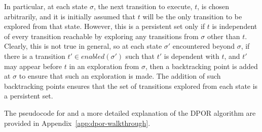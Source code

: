 \documentclass[12pt,a4paper,twoside,openright]{report}
\newcommand{\Let}[2]{\State \textbf{let} #1 = #2 \textbf{in}}
\begin{document}
In particular, at each state $\sigma$, the
next transition
to execute, $t$, is chosen arbitrarily, and it is
initially assumed that $t$ will
be the only transition to be explored from
that state. However, this is a persistent
set only if $t$ is
independent of every transition reachable
by exploring any transitions
from $\sigma$ other than $t$. Clearly,
this is not true in general, so at each
state $\sigma'$ encountered beyond
$\sigma$, if there is a transition
$t' \in \textit{enabled}(\sigma')$
such that $t'$ is dependent with
$t$, and $t'$ may appear before $t$
in an exploration from $\sigma$, then
a backtracking point is added at
$\sigma$ to ensure that such an
exploration is made.
The addition of such backtracking points
ensures that the set of transitions
explored from each state is a
persistent set.

The pseudocode for and a more
detailed explanation of the DPOR
algorithm are provided in
Appendix~\ref{app:dpor-walkthrough}.

\newcommand{\dporpseudocode}{
	\begin{algorithmic}[1]
		\Procedure{Explore}{$\pi$}
		\Let{$\sigma$}{$\textit{last}(\pi)$}
		\ForAll{$p \in \mathcal{P}$}
		\State \Call{UpdateBacktrackSets}
		{$\pi,\, \textit{next}(\sigma, p)$}
		\EndFor
		\If{$\textit{enabled}(\sigma) \neq \emptyset$}
		\Let{$t$}{any $t \in \textit{enabled}(\sigma)$}
		\Let{$\textit{backtrack}(\sigma)$}{$\{t\}$}
		\Let{$\textit{done}(\sigma)$}{$\emptyset$}
		\While{$\textit{done}(\sigma)
			 \neq \textit{backtrack}(\sigma)$}
		\Let{$t$}{any $t \in (\textit{backtrack}(\sigma)
			\setminus \textit{done}(\sigma))$}
		\State add $t$ to $\textit{done}(\sigma);$
		\State \Call{Explore}{$\pi.t$}

		\EndWhile
		\EndIf
		\EndProcedure
		\State
		\Procedure{UpdateBacktrackSets}{$\pi,\, t_{p,s}$}
		\Let{$D$}{$\{i \in \textit{dom}(\pi) \mid
			\pi_i \text{ is dependent with } t_{p,s}
			\text{ and } i \not \hookrightarrow_\pi p\}$}
		\If{$D \neq \emptyset$}
		\Let{$\sigma_d$}
		{$\textit{pre}(\pi,\text{max}(D))$}
		\If{$\textit{next}(\sigma_d, p)
			\in \textit{enabled}(\sigma_d)$}
		add $\textit{next}(\sigma_d, p)$
		to $\textit{backtrack}(\sigma_d)$
		\Else {
			add all of $\textit{enabled}(\sigma_d)$
			to $\textit{backtrack}(\sigma_d)$
		} \EndIf
		\EndIf
		\EndProcedure
		\State
		\State Initially: \Call{Explore}{$\emptyset$}
	\end{algorithmic}
}
\end{document}
